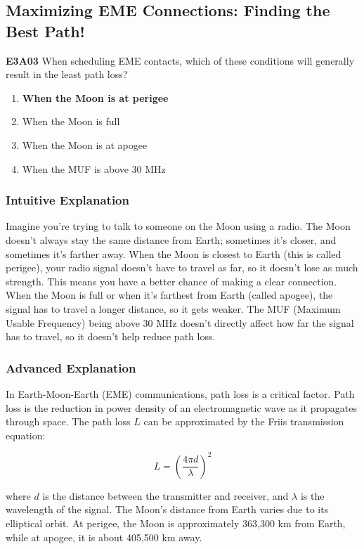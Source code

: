 \subsection{Maximizing EME Connections: Finding the Best Path!}

\begin{tcolorbox}[colback=gray!10!white,colframe=black!75!black,title=E3A03]
\textbf{E3A03} When scheduling EME contacts, which of these conditions will generally result in the least path loss?
\begin{enumerate}[label=\Alph*.]
    \item \textbf{When the Moon is at perigee}
    \item When the Moon is full
    \item When the Moon is at apogee
    \item When the MUF is above 30 MHz
\end{enumerate}
\end{tcolorbox}

\subsubsection{Intuitive Explanation}
Imagine you're trying to talk to someone on the Moon using a radio. The Moon doesn't always stay the same distance from Earth; sometimes it's closer, and sometimes it's farther away. When the Moon is closest to Earth (this is called perigee), your radio signal doesn't have to travel as far, so it doesn't lose as much strength. This means you have a better chance of making a clear connection. When the Moon is full or when it's farthest from Earth (called apogee), the signal has to travel a longer distance, so it gets weaker. The MUF (Maximum Usable Frequency) being above 30 MHz doesn't directly affect how far the signal has to travel, so it doesn't help reduce path loss.

\subsubsection{Advanced Explanation}
In Earth-Moon-Earth (EME) communications, path loss is a critical factor. Path loss is the reduction in power density of an electromagnetic wave as it propagates through space. The path loss \( L \) can be approximated by the Friis transmission equation:

\[
L = \left( \frac{4 \pi d}{\lambda} \right)^2
\]

where \( d \) is the distance between the transmitter and receiver, and \( \lambda \) is the wavelength of the signal. The Moon's distance from Earth varies due to its elliptical orbit. At perigee, the Moon is approximately 363,300 km from Earth, while at apogee, it is about 405,500 km away. 

